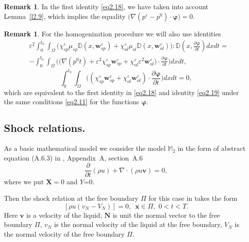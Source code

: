 \documentclass{article}
\theoremstyle{plain}
\theoremstyle{definition}
\newtheorem{remark}[theorem]{Remark}
\numberwithin{equation}{section}
\begin{document}
\begin{remark}\label{2.15}
In the first identity \eqref{eq2.18}, we have taken into account Lemma~\ref{l2.9}, which implies the equality $\big(\nabla(p^{\varepsilon}-p^{0})\cdot\boldsymbol{\varphi}\big)=0$.
\end{remark}

\begin{remark}\label{2.16}
For the homogenization procedure we will also use identities
\begin{equation}\label{eq2.20}
\begin{aligned}
& 
\varepsilon^{2}\int_{0}^{t_{0}}\int_{\Omega}\big(\chi^{\varepsilon}_{sp}\mu_{sp}
\mathbb{D}(x,\boldsymbol{w}^{\varepsilon}_{sp})+\chi^{\varepsilon}_{ol}\mu_{ol}
\mathbb{D}(x,\boldsymbol{w}^{\varepsilon}_{ol})\big):
\mathbb{D}(x,\frac{\partial\boldsymbol{\varphi}}{\partial{t}})dxdt=
\\
& -\int_{0}^{t_{0}}\int_{\Omega}\Big(\big(\nabla({p}^{0}t)+\varepsilon^{2}
\chi^{\varepsilon}_{sp}\boldsymbol{w}^{\varepsilon}_{sp}+\chi^{\varepsilon}_{ol}
\varepsilon^{2}\boldsymbol{w}^{\varepsilon}_{ol}\big)
\cdot\frac{\partial\boldsymbol{\varphi}}{\partial{t}}\Big)dxdt,
\end{aligned}
\end{equation}
\begin{equation}\label{eq2.21}
\int_{0}^{t_{0}}\int_{\Omega}\big((\chi^{\varepsilon}_{sp}
\boldsymbol{w}^{\varepsilon}_{sp}+\chi^{\varepsilon}_{ol}
\boldsymbol{w}^{\varepsilon}_{ol})\cdot\frac{\partial\boldsymbol{\varphi}}{\partial{t}}\big)dxdt=0,
\end{equation}
which are equivalent to the first identity in \eqref{eq2.18} and identity \eqref{eq2.19} under the same conditions \eqref{eq2.11} for the functions $\boldsymbol{\varphi}$.
\end{remark}

\subsection{Shock relations.}

As a basic mathematical model we consider the model $\mathbb{M}_{2}$ in the form of abstract equation (A.6.3) in \cite{14}, Appendix~A, section~A.6
\begin{equation}\label{eq2.22}
\frac{\partial}{\partial{t}}(\rho{u})+\nabla\cdot(\rho{u}\boldsymbol{v})=0,
\end{equation}
where we put $\textbf{X}=0$ and $Y$=0.

Then the shock relation at the free boundary $\Pi$ for this case in takes the form
\begin{equation}\label{eq2.23}
[\rho{u}(v_{N}-V_{N})]=0,\,\,\,\boldsymbol{x}\in\Pi,\,\,0<t<T.
\end{equation}
Here $\boldsymbol{v}$ is a velocity of the liquid, $\boldsymbol{N}$ is unit the normal vector to the free boundary $\Pi$, $v_{N}$ is the normal velocity of the liquid at the free boundary, $V_{N}$ is the normal velocity of the free boundary $\Pi$. 
\end{document}

